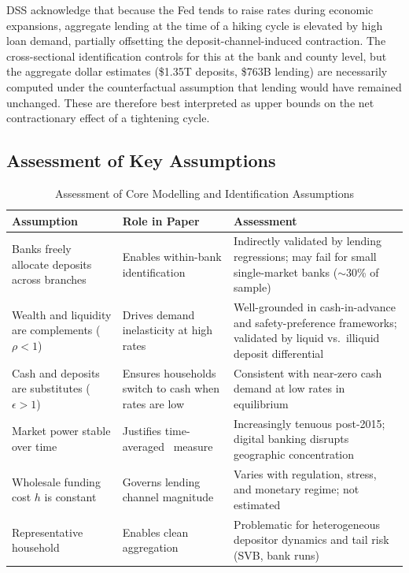 \documentclass[12pt,a4paper]{article}
\newcommand{\HHI}{\text{HHI}}
\begin{document}
\begin{critbox}
DSS acknowledge that because the Fed tends to raise rates during economic
expansions, aggregate lending at the time of a hiking cycle is elevated by
high loan demand, partially offsetting the deposit-channel-induced contraction.
The cross-sectional identification controls for this at the bank and county
level, but the aggregate dollar estimates (\$1.35T deposits, \$763B lending)
are necessarily computed under the counterfactual assumption that lending would
have remained unchanged. These are therefore best interpreted as upper bounds
on the net contractionary effect of a tightening cycle.
\end{critbox}

\subsection{Assessment of Key Assumptions}

\begin{table}[H]
\centering
\caption{Assessment of Core Modelling and Identification Assumptions}
\label{tab:assumptions}
\small
\begin{tabular}{@{}p{4.6cm} p{3.6cm} p{5.2cm}@{}}
\toprule
\textbf{Assumption} & \textbf{Role in Paper} & \textbf{Assessment} \\
\midrule
Banks freely allocate deposits across branches &
  Enables within-bank identification &
  Indirectly validated by lending regressions; may fail for small
  single-market banks ($\sim$30\% of sample) \\[6pt]

Wealth and liquidity are complements ($\rho < 1$) &
  Drives demand inelasticity at high rates &
  Well-grounded in cash-in-advance and safety-preference frameworks;
  validated by liquid vs.\ illiquid deposit differential \\[6pt]

Cash and deposits are substitutes ($\epsilon > 1$) &
  Ensures households switch to cash when rates are low &
  Consistent with near-zero cash demand at low rates in equilibrium \\[6pt]

Market power stable over time &
  Justifies time-averaged \HHI\ measure &
  Increasingly tenuous post-2015; digital banking disrupts
  geographic concentration \\[6pt]

Wholesale funding cost $h$ is constant &
  Governs lending channel magnitude &
  Varies with regulation, stress, and monetary regime; not estimated \\[6pt]

Representative household &
  Enables clean aggregation &
  Problematic for heterogeneous depositor dynamics and tail risk
  (SVB, bank runs) \\
\bottomrule
\end{tabular}
\end{table}
\end{document}
